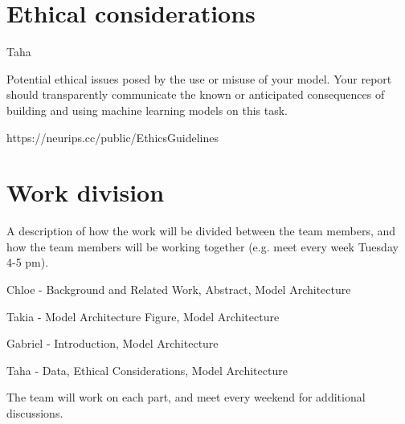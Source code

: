 \documentclass{article}
\begin{document}

\section{Ethical considerations}
Taha

Potential ethical issues posed by the use or misuse of
your model. Your report should transparently
communicate the known or anticipated consequences
of building and using machine learning models on this
task.

https://neurips.cc/public/EthicsGuidelines


\section{Work division}

A description of how the work will be divided between
the team members, and how the team members will be
working together (e.g. meet every week Tuesday 4-5
pm).

Chloe - Background and Related Work, Abstract, Model Architecture

Takia - Model Architecture Figure, Model Architecture

Gabriel - Introduction, Model Architecture

Taha - Data, Ethical Considerations, Model Architecture

The team will work on each part, and meet every weekend for additional discussions. 


\end{document}
